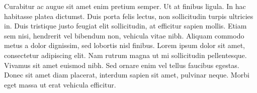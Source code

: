\vspace{0.4cm}

Curabitur ac augue sit amet enim pretium semper. Ut at finibus ligula. In hac habitasse platea dictumst. Duis porta felis lectus, non sollicitudin turpis ultricies in. Duis tristique justo feugiat elit sollicitudin, at efficitur sapien mollis. Etiam sem nisi, hendrerit vel bibendum non, vehicula vitae nibh. Aliquam commodo metus a dolor dignissim, sed lobortis nisl finibus. Lorem ipsum dolor sit amet, consectetur adipiscing elit. Nam rutrum magna ut mi sollicitudin pellentesque. Vivamus sit amet euismod nibh. Sed ornare enim vel tellus faucibus egestas. Donec sit amet diam placerat, interdum sapien sit amet, pulvinar neque. Morbi eget massa ut erat vehicula efficitur. 

